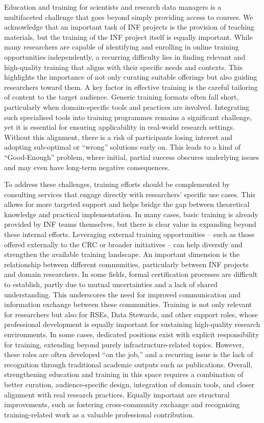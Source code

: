 \documentclass{eceasst}
\begin{document}
\medskip
\noindent Education and training for scientists and research data managers is a multifaceted challenge that goes beyond simply providing access to courses.
We acknowledge that an important task of INF projects is the provision of teaching materials, but the training of the INF project itself is equally important.
While many researchers are capable of identifying and enrolling in online training opportunities independently, a recurring difficulty lies in finding relevant and high-quality training that aligns with their specific needs and contexts.
This highlights the importance of not only curating suitable offerings but also guiding researchers toward them.
A key factor in effective training is the careful tailoring of content to the target audience.
Generic training formats often fall short, particularly when domain-specific tools and practices are involved.
Integrating such specialised tools into training programmes remains a significant challenge,
yet it is essential for ensuring applicability in real-world research settings.
Without this alignment, there is a risk of participants losing interest and adopting sub-optimal or ``wrong'' solutions early on. This leads to a kind of ``Good-Enough'' problem,
where initial, partial success obscures underlying issues and may even have long-term negative consequences.

To address these challenges, training efforts should be complemented by consulting services that engage directly with researchers’ specific use cases.
This allows for more targeted support and helps bridge the gap between theoretical knowledge and practical implementation.
In many cases, basic training is already provided by INF teams themselves, but there is clear value in expanding beyond these internal efforts.
Leveraging external training opportunities -- such as those offered externally to the CRC or broader initiatives -- can help diversify and strengthen the available training landscape.
An important dimension is the relationship between different communities, particularly between INF projects and domain researchers.
In some fields, formal certification processes are difficult to establish, partly due to mutual uncertainties and a lack of shared understanding.
This underscores the need for improved communication and information exchange between these communities.
Training is not only relevant for researchers but also for RSEs, Data Stewards, and other support roles, whose professional development is equally important for sustaining high-quality research environments.
In some cases, dedicated positions exist with explicit responsibility for training, extending beyond purely infrastructure-related topics.
However, these roles are often developed “on the job,” and a recurring issue is the lack of recognition through traditional academic outputs such as publications.
Overall, strengthening education and training in this space requires a combination of better curation,
audience-specific design, integration of domain tools, and closer alignment with real research practices.
Equally important are structural improvements, such as fostering cross-community exchange and recognising training-related work as a valuable professional contribution.
\vspace{-1em}
\end{document}
